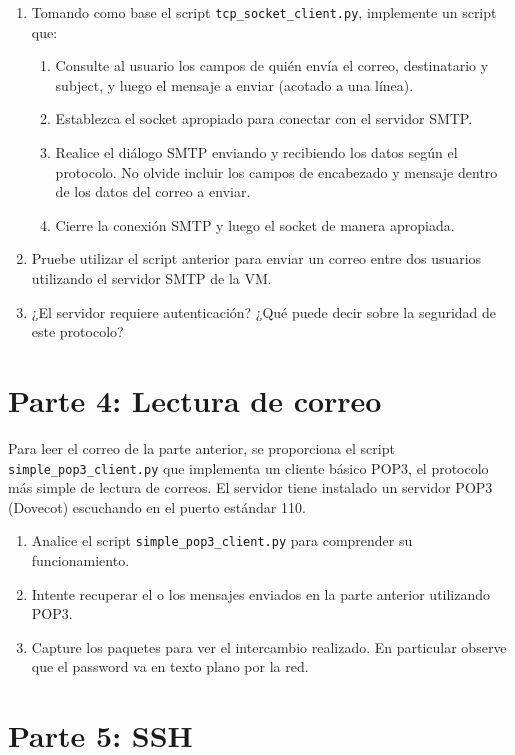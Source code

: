 \documentclass[a4paper,10pt]{article}
\begin{document}
\begin{enumerate}
    \item Tomando como base el script \texttt{tcp\_socket\_client.py}, implemente un script que:
      \begin{enumerate}
        \item Consulte al usuario los campos de quién envía el correo, destinatario y subject, y luego el mensaje a enviar (acotado a una línea).
        \item Establezca el socket apropiado para conectar con el servidor SMTP.
        \item Realice el diálogo SMTP enviando y recibiendo los datos según el protocolo. No olvide incluir los campos de encabezado y mensaje dentro de los datos del correo a enviar.
        \item Cierre la conexión SMTP y luego el socket de manera apropiada.
      \end{enumerate}

    \item Pruebe utilizar el script anterior para enviar un correo entre dos usuarios utilizando el servidor SMTP de la VM.
    \item ¿El servidor requiere autenticación? ¿Qué puede decir sobre la seguridad de este protocolo? 
\end{enumerate}

\section*{Parte 4: Lectura de correo}

Para leer el correo de la parte anterior, se proporciona el script \texttt{simple\_pop3\_client.py} que implementa un cliente básico POP3, el protocolo más simple de lectura de correos. El servidor tiene instalado un servidor POP3 (Dovecot) escuchando en el puerto estándar 110.

\begin{enumerate}
    \item Analice el script \texttt{simple\_pop3\_client.py} para comprender su funcionamiento.
    \item Intente recuperar el o los mensajes enviados en la parte anterior utilizando POP3.
    \item Capture los paquetes para ver el intercambio realizado. En particular observe que el password va en texto plano por la red.
\end{enumerate}

\section*{Parte 5: SSH}
\end{document}
